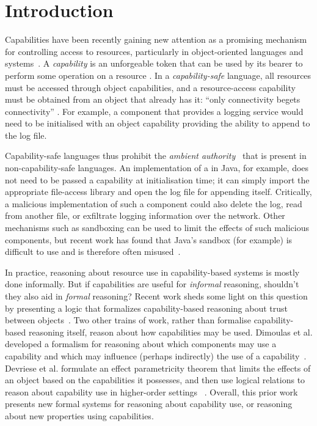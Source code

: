 \section{Introduction}

Capabilities have been recently gaining new attention as a promising mechanism for controlling access to resources, particularly in object-oriented languages and systems~\cite{miller03,drossopoulou07,dimoulas14,devriese16}.
A \textit{capability} is an unforgeable token that can be used by its bearer to perform some operation on a resource \cite{dennis66}.
In a \textit{capability-safe} language, all resources must be accessed through object capabilities, and a resource-access capability must be obtained from an object that already has it: ``only connectivity begets connectivity'' \cite{miller03}.
For example, a  component that provides a logging service would need to be initialised with an object capability providing the ability to append to the log file.

Capability-safe languages thus prohibit the \textit{ambient authority}~\cite{miller06} that is present in non-capability-safe languages.
An implementation of a  in Java, for example, does not need to be passed a capability at initialisation time; it can simply import the appropriate file-access library and open the log file for appending itself.
Critically, a malicious implementation of such a component could also delete the log, read from another file, or exfiltrate logging information over the network.
Other mechanisms such as sandboxing can be used to limit the effects of such malicious components, but recent work has found that Java's sandbox (for example) is difficult to use and is therefore often misused~\cite{coker15, maass16}.

In practice, reasoning about resource use in capability-based systems is mostly done informally.
But if capabilities are useful for \textit{informal} reasoning, shouldn't they also aid in \textit{formal} reasoning?
Recent work sheds some light on this question by presenting a logic that formalizes capability-based reasoning about trust between objects~\cite{drossopoulou07}.
Two other trains of work, rather than formalise capability-based reasoning itself, reason about how capabilities may be used.
Dimoulas et al. developed a formalism for reasoning about which components may use a capability and which may influence (perhaps indirectly) the use of a capability~\cite{dimoulas14}.
Devriese et al. formulate an effect parametricity theorem that limits the effects of an object based on the capabilities it possesses, and then use logical relations to reason about capability use in higher-order settings~\cite{devriese16} .
Overall, this prior work presents new formal systems for reasoning about capability use, or reasoning about new properties using capabilities.

